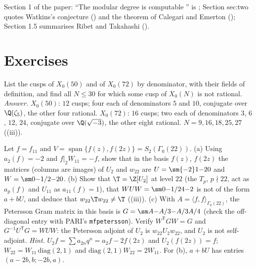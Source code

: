 \begin{paperlink}\label{pl:moddeg:two}
Section 1 of the paper: ``The modular degree is computable \cite{Cremona97,Watkins02}'' is ; Section sec:two quotes Watkins's conjecture
() and the theorem of Calegari and Emerton (); Section 1.5 summarises Ribet and Takahashi ().
\end{paperlink}

\section{Exercises}\label{sec:moddeg:exercises}

\begin{exercise}\label{ex:moddeg:ex-cusps}
List the cusps of $X_0(50)$ and of $X_0(72)$ by denominator, with their fields of definition, and find all $N\le30$ for which some cusp of $X_0(N)$ is not rational.
\emph{Answer.} $X_0(50)$: $12$ cusps; four each of denominators $5$ and $10$, conjugate over $\Q(\zeta_5)$, the other four rational. $X_0(72)$: $16$ cusps; two each of denominators $3$, $6$, $12$, $24$, conjugate
over $\Q(\sqrt{-3})$, the other eight rational. $N=9,16,18,25,27$ ((iii)).
\end{exercise}

\begin{exercise}\label{ex:moddeg:ex-u2}
Let $f=f_{11}$ and $V=\operatorname{span}\{f(z),f(2z)\}=S_2(\Gamma_0(22))$. (a) Using $a_2(f)=-2$ and $f|_2W_{11}=-f$, show that in the basis $f(z)$, $f(2z)$ the matrices (columns are images) of $U_2$ and
$w_{22}$ are $U=\sm{-2}1{-2}0$ and $W=\sm0{-1/2}{-2}0$. (b) Show that $\T=\Z[U_2]$ at level $22$ (the $T_p$, $p\nmid22$, act as $a_p(f)$ and $U_{11}$ as $a_{11}(f)=1$), that $WUW=\sm0{-1/2}4{-2}$ is not of the form $a+bU$, and deduce that $w_{22}\T w_{22}\ne\T$
((iii)). (c) With $A=\langle f,f\rangle_{\Gamma_0(22)}$, the Petersson Gram matrix in this basis is $G=\sm A{-A/3}{-A/3}{A/4}$ (check the off-diagonal entry with PARI's
\texttt{mfpetersson}). Verify $W^{\mathsf T}GW=G$ and $G^{-1}U^{\mathsf T}G=WUW$: the Petersson adjoint of $U_2$ is $w_{22}U_2w_{22}$, and $U_2$ is not self-adjoint.
\emph{Hint.} $U_2f=\sum a_{2n}q^n=a_2f-2f(2z)$ and $U_2(f(2z))=f$; $W_{22}=W_{11}\,\mathrm{diag}(2,1)$ and $\mathrm{diag}(2,1)W_{22}=2W_{11}$. For (b), $a+bU$ has entries $(a-2b,b;-2b,a)$.
\end{exercise}

